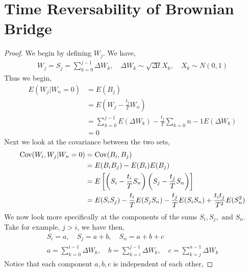 \documentclass{article}
\begin{document}
\maketitle 
\setlength{\parindent}{0pt}

\section{Time Reversability of Brownian Bridge}
    \begin{proof}
        We begin by defining $W_j$. We have, 
        \begin{gather*}
            W_j = S_j = \sum_{k=0}^{j-1} \Delta W_k, \quad \Delta W_k \sim
            \sqrt{\Delta t}X_k, \quad X_k \sim N(0,1)
        \end{gather*}
        Thus we begin, 
        \begin{align*}
            E(W_j | W_n = 0) &= E(B_j)
            \\
            &= E\left(W_j - \frac{t_j}{T}W_n\right)
            \\ 
            &= \sum_{k=0}^{j-1} E(\Delta W_k) -
            \frac{t_j}{T}\sum_{k=0}{n-1}E(\Delta W_k)
            \\
            &= 0
        \end{align*}
        Next we look at the covariance between the two sets, 
        \begin{align*}
            \text{Cov}(W_i, W_j | W_n = 0) &= \text{Cov}(B_i, B_j) 
            \\
            &= E(B_iB_j) - E(B_i)E(B_j)
            \\
            &= E\left[\left(S_i - \frac{t_i}{T}S_n\right)\left(S_j -
            \frac{t_j}{T}S_n\right)\right]
            \\
            &= E(S_iS_j) - \frac{t_i}{T}E(S_jS_n) - \frac{t_j}{T}E(S_iS_n) +
            \frac{t_it_j}{T^2}E(S_n^2)
        \end{align*}
        We now look more specifically at the components of the sums $S_i, S_j,
        \text{ and } S_n$.  Take for example, $j > i$, we have then, 
        \begin{gather*}
            S_i = a, \quad S_j = a + b, \quad S_n = a + b + c
            \\
            a = \sum_{k=0}^{i-1} \Delta W_k, \quad b = \sum_{k=i}^{j-1} \Delta
            W_k, \quad c = \sum_{k=j}^{n-1}\Delta W_k
        \end{gather*}
        Notice that each component $a,b,c$ is independent of each other,

\end{proof}
\end{document}
